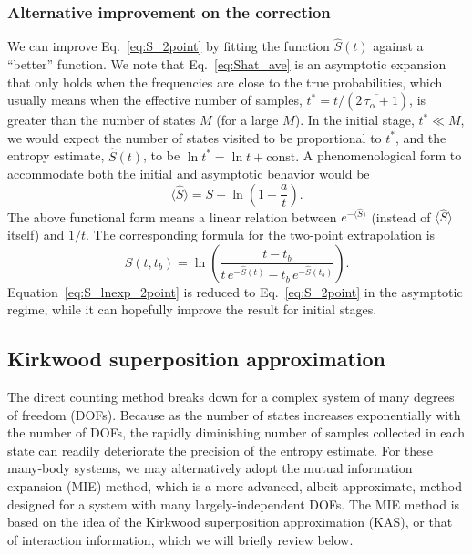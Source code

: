 \documentclass[reprint, superscriptaddress]{revtex4-1}
\begin{document}
\subsubsection{Alternative improvement on the correction}

We can improve Eq.~\eqref{eq:S_2point} by
fitting the function $\hat S(t)$ against a ``better'' function.
%
We note that Eq.~\eqref{eq:Shat_ave} is an asymptotic expansion
that only holds when the frequencies are close to the true probabilities,
which usually means when the effective number of samples,
$t^* = t/(\overline{2 \, \tau_\alpha + 1})$, is greater than
the number of states $M$ (for a large $M$).
%
In the initial stage, $t^* \ll M$,
we would expect the number of states visited to be proportional to $t^*$,
and the entropy estimate, $\hat S(t)$,
to be $\ln t^* = \ln t + \mathrm{const.}$
%
A phenomenological form to accommodate both the initial and asymptotic behavior
would be
$$
  \bigl\langle \hat S \bigr\rangle
  = S - \ln\left(1 + \frac{a}{t}\right).
$$
The above functional form means a linear relation between
$e^{-\bigl\langle \hat S \bigr\rangle}$
(instead of $\bigl\langle \hat S \bigr\rangle$ itself)
and $1/t$.
%
The corresponding formula for the two-point extrapolation is
%
\begin{equation}
  \hat S(t, t_b) = \ln\left(
    \frac{ t - t_b }
         { t \, e^{-\hat S(t)} - t_b \, e^{-\hat S(t_b)} }
  \right)
  .
  \label{eq:S_lnexp_2point}
\end{equation}
%
Equation~\eqref{eq:S_lnexp_2point} is reduced to
Eq.~\eqref{eq:S_2point} in the asymptotic regime,
while it can hopefully improve the result for initial stages.



\subsection{Kirkwood superposition approximation}


The direct counting method breaks down
for a complex system of many degrees of freedom (DOFs).
%
Because as the number of states increases exponentially with the number of DOFs,
the rapidly diminishing number of samples collected in each state
can readily deteriorate the precision of the entropy estimate.
%
For these many-body systems,
we may alternatively adopt
the mutual information expansion (MIE) method,
which is a more advanced, albeit approximate, method designed for a system
with many largely-independent DOFs.
%
The MIE method is based on the idea of
the Kirkwood superposition approximation (KAS)\cite{kirkwood1935, born1946},
or that of interaction information\cite{mcgill1954},
which we will briefly review below.
\end{document}
